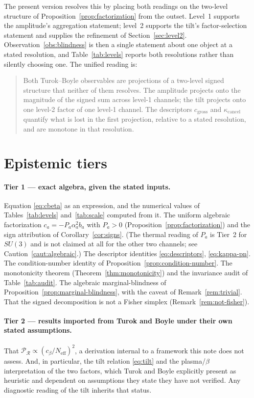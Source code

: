 \documentclass[11pt]{article}
\theoremstyle{definition}
\theoremstyle{remark}
\newcommand{\gross}{c_{\mathrm{gross}}}
\newcommand{\kcancel}{\kappa_{\mathrm{cancel}}}
\begin{document}
The present version resolves this by placing both readings on the two-level structure of
Proposition~\ref{prop:factorization} from the outset. Level~1 supports the amplitude's aggregation
statement; level~2 supports the tilt's factor-selection statement and supplies the refinement of
Section~\ref{sec:level2}. Observation~\ref{obs:blindness} is then a single statement about one
object at a stated resolution, and Table~\ref{tab:levels} reports both resolutions rather than
silently choosing one. The unified reading is:

\begin{quote}
Both Turok--Boyle observables are projections of a two-level signed structure that neither of them
resolves. The amplitude projects onto the magnitude of the signed sum across level-1 channels; the
tilt projects onto one level-2 factor of one level-1 channel. The descriptors $\gross$ and
$\kcancel$ quantify what is lost in the first projection, relative to a stated resolution, and are
monotone in that resolution.
\end{quote}

\section{Epistemic tiers}
\label{sec:tiers}

\paragraph{Tier 1 --- exact algebra, given the stated inputs.} Equation \eqref{eq:cbeta} as an
expression, and the numerical values of Tables~\ref{tab:levels} and~\ref{tab:scale} computed from
it. The uniform algebraic factorization $c_a=-P_a\alpha_a^2 b_a$ with $P_a>0$
(Proposition~\ref{prop:factorization}) and the sign attribution of Corollary~\ref{cor:signs}. (The
thermal reading of $P_a$ is Tier~2 for $SU(3)$ and is not claimed at all for the other two
channels; see Caution~\ref{caut:algebraic}.) The descriptor identities \eqref{eq:descriptors},
\eqref{eq:kappa-pn}. The condition-number identity of Proposition~\ref{prop:condition-number}. The
monotonicity theorem (Theorem~\ref{thm:monotonicity}) and the invariance audit of
Table~\ref{tab:audit}. The algebraic marginal-blindness of Proposition~\ref{prop:marginal-blindness},
with the caveat of Remark~\ref{rem:trivial}. That the signed decomposition is not a Fisher simplex
(Remark~\ref{rem:not-fisher}).

\paragraph{Tier 2 --- results imported from Turok and Boyle under their own stated assumptions.}
That $\mathcal{P}_\mathcal{R} \propto (c_\beta/N_{\mathrm{eff}})^2$, a derivation internal to a
framework this note does not assess. And, in particular, the tilt relation \eqref{eq:tilt} and the
plasma/$\beta$ interpretation of the two factors, which Turok and Boyle explicitly present as
heuristic and dependent on assumptions they state they have not verified. Any diagnostic reading of
the tilt inherits that status.
\end{document}
